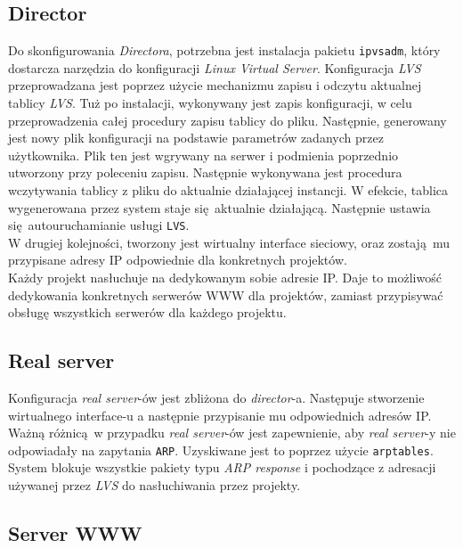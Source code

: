 \subsection{Director}
Do skonfigurowania \textit{Directora}, potrzebna jest instalacja pakietu \texttt{ipvsadm}, który dostarcza narzędzia do konfiguracji \textit{Linux Virtual Server}.
Konfiguracja \textit{LVS} przeprowadzana jest poprzez użycie mechanizmu zapisu i odczytu aktualnej tablicy \textit{LVS}.
Tuż po instalacji, wykonywany jest zapis konfiguracji, w celu przeprowadzenia całej procedury zapisu tablicy do pliku.
Następnie, generowany jest nowy plik konfiguracji na podstawie parametrów zadanych przez użytkownika.
Plik ten jest wgrywany na serwer i podmienia poprzednio utworzony przy poleceniu zapisu.
Następnie wykonywana jest procedura wczytywania tablicy z pliku do aktualnie działającej instancji.
W efekcie, tablica wygenerowana przez system staje się aktualnie działającą.
Następnie ustawia się autouruchamianie usługi \texttt{LVS}.\\
W drugiej kolejności, tworzony jest wirtualny interface sieciowy, oraz zostają mu przypisane adresy IP odpowiednie dla konkretnych projektów.\\
Każdy projekt nasłuchuje na dedykowanym sobie adresie IP.
Daje to możliwość dedykowania konkretnych serwerów WWW dla projektów, zamiast przypisywać obsługę wszystkich serwerów dla każdego projektu.
\subsection{Real server}
Konfiguracja \textit{real server}-ów jest zbliżona do \textit{director}-a.
Następuje stworzenie wirtualnego interface-u a następnie przypisanie mu odpowiednich adresów IP.
Ważną różnicą w przypadku \textit{real server}-ów jest zapewnienie, aby \textit{real server}-y nie odpowiadały na zapytania \texttt{ARP}.
Uzyskiwane jest to poprzez użycie \texttt{arptables}.
System blokuje wszystkie pakiety typu \textit{ARP response} i pochodzące z adresacji używanej przez \textit{LVS} do nasłuchiwania przez projekty.
\subsection{Server WWW}
